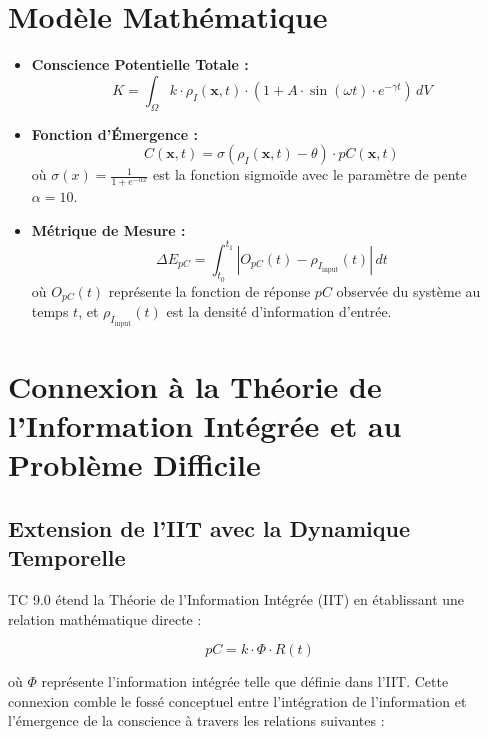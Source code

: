 \documentclass[12pt]{article}
\begin{document}
\section{Modèle Mathématique}
\begin{itemize}
    \item \textbf{Conscience Potentielle Totale :} 
    \begin{equation}
    K = \int_{\Omega} k \cdot \rho_I(\mathbf{x}, t) \cdot \left(1 + A \cdot \sin(\omega t) \cdot e^{-\gamma t}\right) \, dV
    \end{equation}
    
    \item \textbf{Fonction d'Émergence :} 
    \begin{equation}
    C(\mathbf{x}, t) = \sigma(\rho_I(\mathbf{x}, t) - \theta) \cdot pC(\mathbf{x}, t)
    \end{equation}
    où $\sigma(x) = \frac{1}{1 + e^{-\alpha x}}$ est la fonction sigmoïde avec le paramètre de pente $\alpha = 10$.
    
    \item \textbf{Métrique de Mesure :} 
    \begin{equation}
    \Delta E_{pC} = \int_{t_0}^{t_1} |O_{pC}(t) - \rho_{I_{\text{input}}}(t)| \, dt
    \end{equation}
    où $O_{pC}(t)$ représente la fonction de réponse $pC$ observée du système au temps $t$, et $\rho_{I_{\text{input}}}(t)$ est la densité d'information d'entrée.
\end{itemize}

\section{Connexion à la Théorie de l'Information Intégrée et au Problème Difficile}

\subsection{Extension de l'IIT avec la Dynamique Temporelle}
TC 9.0 étend la Théorie de l'Information Intégrée (IIT) \cite{tononi2008,tononi2016} en établissant une relation mathématique directe :

\begin{equation}
pC = k \cdot \Phi \cdot R(t)
\end{equation}

où $\Phi$ représente l'information intégrée telle que définie dans l'IIT. Cette connexion comble le fossé conceptuel entre l'intégration de l'information et l'émergence de la conscience à travers les relations suivantes :
\end{document}
